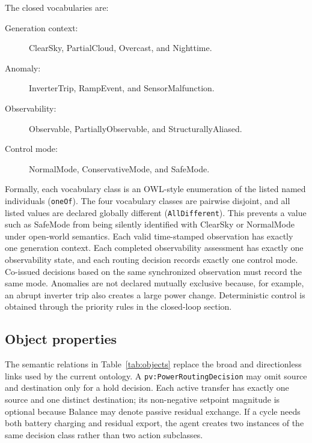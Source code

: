 \documentclass[
	letterpaper,
	10pt,
	unnumberedsections,
	twoside,
]{LTJournalArticle}
\newcommand{\pv}[1]{\texttt{pv:#1}}
\newcommand{\valueof}[1]{\textsf{#1}}
\begin{document}
The closed vocabularies are:
\begin{description}
	\item[Generation context:] \valueof{ClearSky}, \valueof{PartialCloud}, \valueof{Overcast}, and \valueof{Nighttime}.
	\item[Anomaly:] \valueof{InverterTrip}, \valueof{RampEvent}, and \valueof{SensorMalfunction}.
	\item[Observability:] \valueof{Observable}, \valueof{PartiallyObservable}, and \valueof{StructurallyAliased}.
	\item[Control mode:] \valueof{NormalMode}, \valueof{ConservativeMode}, and \valueof{SafeMode}.
\end{description}
Formally, each vocabulary class is an OWL-style enumeration of the listed named individuals (\texttt{oneOf}). The four vocabulary classes are pairwise disjoint, and all listed values are declared globally different (\texttt{AllDifferent}). This prevents a value such as \valueof{SafeMode} from being silently identified with \valueof{ClearSky} or \valueof{NormalMode} under open-world semantics.
Each valid time-stamped observation has exactly one generation context. Each completed observability assessment has exactly one observability state, and each routing decision records exactly one control mode. Co-issued decisions based on the same synchronized observation must record the same mode. Anomalies are not declared mutually exclusive because, for example, an abrupt inverter trip also creates a large power change. Deterministic control is obtained through the priority rules in the closed-loop section.

\subsection{Object properties}

The semantic relations in Table~\ref{tab:objects} replace the broad and directionless links used by the current ontology. A \pv{PowerRoutingDecision} may omit source and destination only for a hold decision. Each active transfer has exactly one source and one distinct destination; its non-negative setpoint magnitude is optional because \valueof{Balance} may denote passive residual exchange. If a cycle needs both battery charging and residual export, the agent creates two instances of the same decision class rather than two action subclasses.
\end{document}

